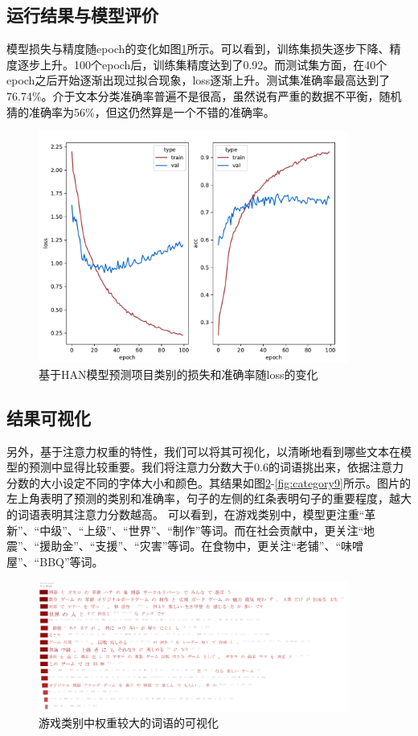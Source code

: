 \documentclass[lang=cn,a4paper]{elegantpaper}
\begin{document}
\subsection{运行结果与模型评价}

模型损失与精度随epoch的变化如图\ref{fig:han multi loss}所示。可以看到，训练集损失逐步下降、精度逐步上升。100个epoch后，训练集精度达到了0.92。而测试集方面，在40个epoch之后开始逐渐出现过拟合现象，loss逐渐上升。测试集准确率最高达到了76.74\%。介于文本分类准确率普遍不是很高，虽然说有严重的数据不平衡，随机猜的准确率为56\%，但这仍然算是一个不错的准确率。
\begin{figure}[!h]
  \centering
  \includegraphics[width=4in]{image/han multi train.pdf}
  \caption{基于HAN模型预测项目类别的损失和准确率随loss的变化}
  \label{fig:han multi loss}
\end{figure}
\subsection{结果可视化}
另外，基于注意力权重的特性，我们可以将其可视化，以清晰地看到哪些文本在模型的预测中显得比较重要。我们将注意力分数大于0.6的词语挑出来，依据注意力分数的大小设定不同的字体大小和颜色。其结果如图\ref{fig:category3}-\ref{fig:category9}所示。图片的左上角表明了预测的类别和准确率，句子的左侧的红条表明句子的重要程度，越大的词语表明其注意力分数越高。
可以看到，在游戏类别中，模型更注重“革新”、“中级”、“上级”、“世界”、“制作”等词。而在社会贡献中，更关注“地震”、“援助金”、“支援”、“灾害”等词。在食物中，更关注“老铺”、“味噌屋”、“BBQ”等词。
\begin{figure}[!htbp]
  \centering
  \includegraphics[width=4in]{image/3.jpg}
  \caption{游戏类别中权重较大的词语的可视化}
  \label{fig:category3}
\end{figure}
\end{document}
